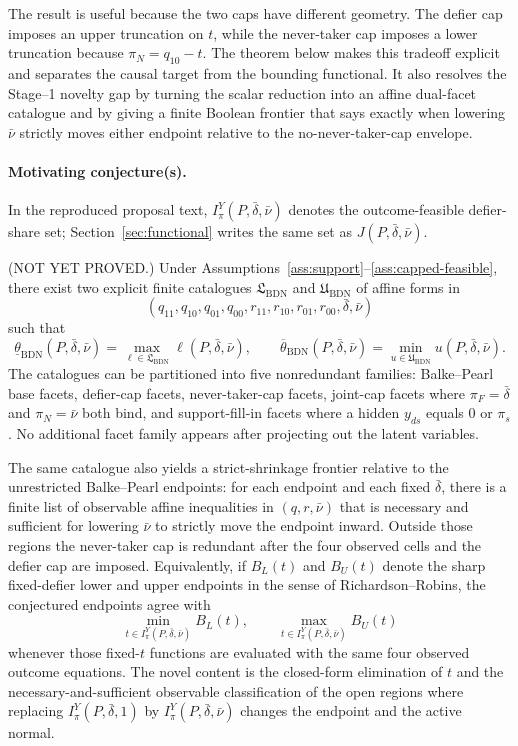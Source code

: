 \documentclass[11pt]{article}
\theoremstyle{definition}
\theoremstyle{plain}
\theoremstyle{remark}
\begin{document}
The result is useful because the two caps have different geometry.  The defier
cap imposes an upper truncation on \(t\), while the never-taker cap imposes a
lower truncation because \(\pi_N=q_{10}-t\).  The theorem below makes this
tradeoff explicit and separates the causal target from the bounding
functional.  It also resolves the Stage--1 novelty gap by turning the scalar
reduction into an affine dual-facet catalogue and by giving a finite Boolean
frontier that says exactly when lowering \(\bar\nu\) strictly moves either
endpoint relative to the no-never-taker-cap envelope.

\paragraph{Motivating conjecture(s).}
In the reproduced proposal text, \(I_\pi^Y(P,\bar\delta,\bar\nu)\) denotes the
outcome-feasible defier-share set; Section~\ref{sec:functional} writes the
same set as \(J(P,\bar\delta,\bar\nu)\).

\begin{conjecture}\label{conj:facet-envelope}
(NOT YET PROVED.)  Under Assumptions~\ref{ass:support}--\ref{ass:capped-feasible}, there
exist two explicit finite catalogues
\(\mathfrak{L}_{\mathrm{BDN}}\) and \(\mathfrak{U}_{\mathrm{BDN}}\) of affine
forms in
\[
(q_{11},q_{10},q_{01},q_{00},r_{11},r_{10},r_{01},r_{00},
  \bar\delta,\bar\nu)
\]
such that
\[
\underline\theta_{\mathrm{BDN}}(P,\bar\delta,\bar\nu)
=\max_{\ell\in\mathfrak{L}_{\mathrm{BDN}}}\ell(P,\bar\delta,\bar\nu),
\qquad
\overline\theta_{\mathrm{BDN}}(P,\bar\delta,\bar\nu)
=\min_{u\in\mathfrak{U}_{\mathrm{BDN}}}u(P,\bar\delta,\bar\nu).
\]
The catalogues can be partitioned into five nonredundant families:
Balke--Pearl base facets, defier-cap facets, never-taker-cap facets,
joint-cap facets where \(\pi_F=\bar\delta\) and \(\pi_N=\bar\nu\) both bind,
and support-fill-in facets where a hidden \(y_{ds}\) equals \(0\) or \(\pi_s\).
No additional facet family appears after projecting out the latent variables.

The same catalogue also yields a strict-shrinkage frontier relative to the
unrestricted Balke--Pearl endpoints: for each endpoint and each fixed
\(\bar\delta\), there is a finite list of observable affine inequalities in
\((q,r,\bar\nu)\) that is necessary and sufficient for lowering \(\bar\nu\) to
strictly move the endpoint inward.  Outside those regions the never-taker cap
is redundant after the four observed cells and the defier cap are imposed.
Equivalently, if \(B_L(t)\) and \(B_U(t)\) denote the sharp fixed-defier lower
and upper endpoints in the sense of Richardson--Robins, the conjectured
endpoints agree with
\[
\min_{t\in I_{\pi}^{Y}(P,\bar\delta,\bar\nu)}B_L(t),
\qquad
\max_{t\in I_{\pi}^{Y}(P,\bar\delta,\bar\nu)}B_U(t)
\]
whenever those fixed-\(t\) functions are evaluated with the same four observed
outcome equations.  The novel content is the closed-form elimination of \(t\)
and the necessary-and-sufficient observable classification of the open regions
where replacing \(I_{\pi}^{Y}(P,\bar\delta,1)\) by
\(I_{\pi}^{Y}(P,\bar\delta,\bar\nu)\) changes the endpoint and the active
normal.
\end{conjecture}
\end{document}
